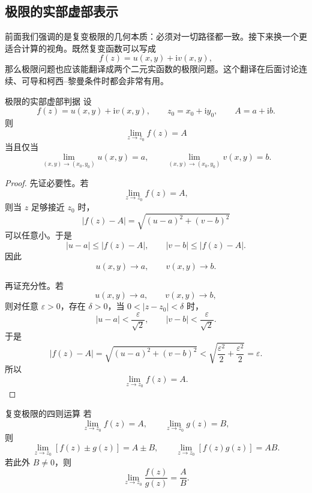 \subsection{极限的实部虚部表示}

前面我们强调的是复变极限的几何本质：必须对一切路径都一致。接下来换一个更适合计算的视角。既然复变函数可以写成
\[
    f(z)=u(x,y)+\mathrm{i}v(x,y),
\]
那么极限问题也应该能翻译成两个二元实函数的极限问题。这个翻译在后面讨论连续、可导和柯西--黎曼条件时都会非常有用。

\begin{dingli}{极限的实部虚部判据}{}\label{thm:ch02-limit-real-imag}
设
\[
    f(z)=u(x,y)+\mathrm{i}v(x,y),\qquad z_0=x_0+\mathrm{i}y_0,\qquad A=a+\mathrm{i}b.
\]
则
\[
    \lim_{z\to z_0}f(z)=A
\]
当且仅当
\[
    \lim_{(x,y)\to(x_0,y_0)}u(x,y)=a,\qquad
    \lim_{(x,y)\to(x_0,y_0)}v(x,y)=b.
\]
\end{dingli}

\begin{proof}
先证必要性。若
\[
    \lim_{z\to z_0}f(z)=A,
\]
则当 $z$ 足够接近 $z_0$ 时，
\[
    |f(z)-A|
    =\sqrt{(u-a)^2+(v-b)^2}
\]
可以任意小。于是
\[
    |u-a|\le |f(z)-A|,\qquad |v-b|\le |f(z)-A|.
\]
因此
\[
    u(x,y)\to a,\qquad v(x,y)\to b.
\]

再证充分性。若
\[
    u(x,y)\to a,\qquad v(x,y)\to b,
\]
则对任意 $\varepsilon>0$，存在 $\delta>0$，当 $0<|z-z_0|<\delta$ 时，
\[
    |u-a|<\frac{\varepsilon}{\sqrt{2}},\qquad |v-b|<\frac{\varepsilon}{\sqrt{2}}.
\]
于是
\[
    |f(z)-A|
    =\sqrt{(u-a)^2+(v-b)^2}
    <\sqrt{\frac{\varepsilon^2}{2}+\frac{\varepsilon^2}{2}}
    =\varepsilon.
\]
所以
\[
    \lim_{z\to z_0}f(z)=A.
\]
\end{proof}

\begin{dingli}{复变极限的四则运算}{}
若
\[
    \lim_{z\to z_0}f(z)=A,\qquad \lim_{z\to z_0}g(z)=B,
\]
则
\[
    \lim_{z\to z_0}[f(z)\pm g(z)]=A\pm B,\qquad
    \lim_{z\to z_0}[f(z)g(z)]=AB.
\]
若此外 $B\neq 0$，则
\[
    \lim_{z\to z_0}\frac{f(z)}{g(z)}=\frac{A}{B}.
\]
\end{dingli}

